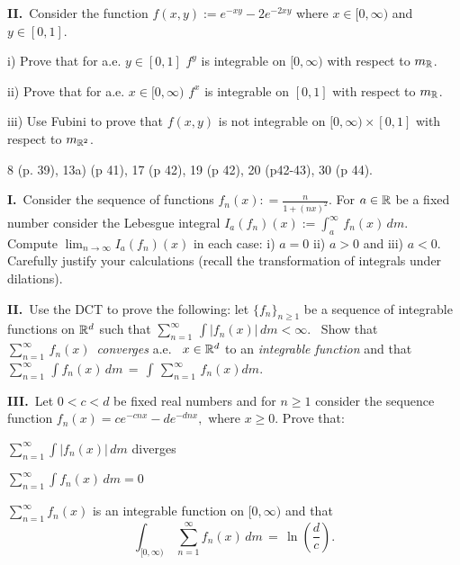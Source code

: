 \smallskip
{\bf II.\,}   Consider the function $f(x,y):=  e^{-xy} - 2 e^{-2xy}$ where $ x \in [ 0, \infty)$ and $ y \in  [ 0,1]$. 

i)  Prove that for a.e.  $y \in [0,1]$  $f^{y}$ is integrable on $[0, \infty)$ with respect to  $m_{\Bbb R}$. 

ii) Prove that for a.e.  $x \in [0,\infty)$  $f^{x}$ is integrable on $[0, 1]$ with respect to  $m_{\Bbb R}$.

iii) Use Fubini to prove that $f(x,y)$ is not integrable
on $[ 0, \infty) \times [ 0,1]$ with respect to  $m_{\Bbb R^2}$.   

\bigskip

\endhead

\medskip


   8 (p. 39),   13a) (p 41), 17 (p 42), 19 (p 42),  20 (p42-43),  30 (p 44).
\medskip
{} 

{\bf I.\,}   Consider the sequence of functions $f_n(x): = \frac{n}{1 +  (n x)^2}$.  For $a \in \Bbb R$ be a fixed number consider the Lebesgue integral $I_a(f_n)(x) := \int_a^\infty \, f_n(x)  \, dm$. Compute $\lim_{n \to \infty} I_a(f_n)(x)$ in each case: i) $a =0$  ii) $a > 0$  and iii) $a <0$. Carefully justify your calculations (recall the transformation of integrals under dilations). 

\medskip 

{\bf II.\,}   Use the DCT to prove the following:   let $\{f_n\}_{n \ge 1}$ be a sequence of integrable functions on $\Bbb R^d$ such that $\sum_{n=1}^{\infty}\,  \int  |f_n(x)| \, dm < \infty$.  \, Show that   $\sum_{n=1}^{\infty}\,  f_n(x) \,$ {\it converges} a.e. \, $x \in \Bbb R^d$ to an {\it integrable function} and that  $\sum_{n=1}^{\infty}\,  \int  f_n(x) \, dm \, = \,  \int \, \sum_{n=1}^{\infty}\,  f_n(x)  dm$.

\medskip 

{\bf III.\,}  Let $ 0 < c <d$ be fixed real numbers and for $n \geq 1$ consider the sequence function $f_n(x) =    c e^{ - c n x}  -    d e^{ - d n x},$ where $ x \geq 0$. Prove that:

\roster
\item  $\sum_{n=1}^{\infty} \int |f_n(x)| \, dm   $   diverges 
\item  $\sum_{n=1}^{\infty} \int f_n(x) \, dm  = 0 $  
\item  $\sum_{n=1}^{\infty} f_n(x)$   is an integrable function on $[0, \infty)$ and that 
$$ \int_{[0, \infty)} \, \sum_{n=1}^{\infty} f_n(x)  \, dm \, =\, \ln(\frac{d}{c}). $$
\endroster

